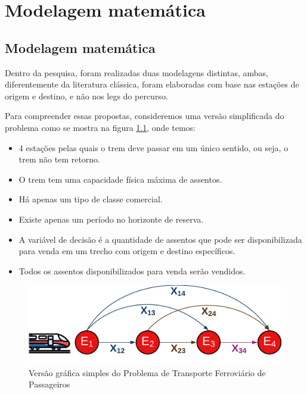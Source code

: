 \chapter{Modelagem matemática }

\section{Modelagem matemática}

Dentro da pesquisa, foram realizadas duas modelagens distintas, ambas, diferentemente da literatura clássica, foram elaboradas com base nas estações de origem e destino, e não nos legs do percurso.

Para compreender essas propostas, consideremos uma versão simplificada do problema como se mostra na figura \ref{fig: fig1}, onde temos:

\begin{itemize}
	\item 4 estações pelas quais o trem deve passar em um único sentido, ou seja, o trem não tem retorno.
	\item O trem tem uma capacidade física máxima de assentos.
	\item Há apenas um tipo de classe comercial.
	\item Existe apenas um período no horizonte de reserva.
	\item A variável de decisão é a quantidade de assentos que pode ser disponibilizada para venda em um trecho com origem e destino específicos.
	\item Todos os assentos disponibilizados para venda serão vendidos.
\end{itemize}

\begin{figure}[th]
	\begin{center}
		\includegraphics[scale=0.18]{img/repre_ini1.png}
		\caption{Versão gráfica simples do Problema de Transporte Ferroviário de Passageiros}
		\label{fig: fig1}
	\end{center}
\end{figure}


